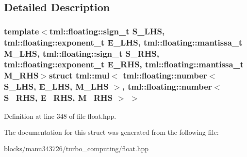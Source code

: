\subsection{Detailed Description}
\subsubsection*{template$<$tml\+::floating\+::sign\+\_\+t S\+\_\+\+L\+H\+S, tml\+::floating\+::exponent\+\_\+t E\+\_\+\+L\+H\+S, tml\+::floating\+::mantissa\+\_\+t M\+\_\+\+L\+H\+S, tml\+::floating\+::sign\+\_\+t S\+\_\+\+R\+H\+S, tml\+::floating\+::exponent\+\_\+t E\+\_\+\+R\+H\+S, tml\+::floating\+::mantissa\+\_\+t M\+\_\+\+R\+H\+S$>$struct tml\+::mul$<$ tml\+::floating\+::number$<$ S\+\_\+\+L\+H\+S, E\+\_\+\+L\+H\+S, M\+\_\+\+L\+H\+S $>$, tml\+::floating\+::number$<$ S\+\_\+\+R\+H\+S, E\+\_\+\+R\+H\+S, M\+\_\+\+R\+H\+S $>$ $>$}



Definition at line 348 of file float.\+hpp.



The documentation for this struct was generated from the following file\+:\begin{DoxyCompactItemize}
\item 
blocks/manu343726/turbo\+\_\+computing/float.\+hpp\end{DoxyCompactItemize}

